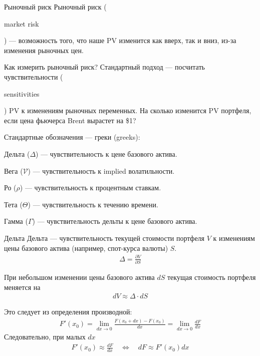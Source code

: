 \documentclass{beamer}
\newcommand{\en}[1]{\begin{otherlanguage}{english}#1\end{otherlanguage}}
\begin{document}
\begin{frame}{Рыночный риск}
\justify
\alert{Рыночный риск} (\en{market risk}) --- возможность того, что наше PV изменится как вверх, так и вниз, из-за изменения рыночных цен.

\justify
Как измерить рыночный риск? Стандартный подход --- посчитать чувствительности (\en{sensitivities}) PV к изменениям рыночных переменных. На сколько изменится PV портфеля, если цена фьючерса Brent вырастет на \$1?

\justify
Стандартные обозначения --- греки (greeks):

Дельта ($\Delta$) --- чувствительность к цене базового актива.

Вега ($\mathcal{V}$) --- чувствительность к implied волатильности.

Ро ($\rho$) --- чувствительность к процентным ставкам.

Тета ($\Theta$) --- чувствительность к течению времени.

Гамма ($\Gamma$) --- чувствительность дельты к цене базового актива.
\end{frame}



\begin{frame}{Дельта}
\justify
\alert{Дельта} --- чувствительность текущей стоимости портфеля $V$ к изменениям цены базового актива (например, спот-курса валюты) $S$. 
\begin{align*}
\Delta = \frac{\partial V}{\partial S}
\end{align*}

\justify
При небольшом изменении цены базового актива $dS$ текущая стоимость портфеля меняется на
\begin{align*}
dV \approx \Delta\cdot dS
\end{align*}

\justify
Это следует из определения производной:
\begin{align*}
F'(x_0) = \lim_{dx \to 0} \frac{F(x_0+dx) - F(x_0)}{dx} = \lim_{dx \to 0} \frac{dF}{dx}
\end{align*}
Следовательно, при малых $dx$
\begin{align*}
F'(x_0) \approx \frac{dF}{dx} \quad \Leftrightarrow \quad dF \approx F'(x_0)dx
\end{align*}
\end{frame}
\end{document}
